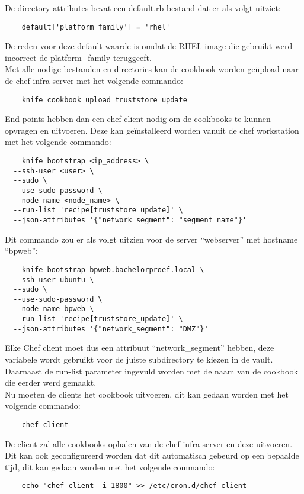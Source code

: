De directory attributes bevat een default.rb bestand dat er als volgt uitziet:
\begin{verbatim}
    default['platform_family'] = 'rhel'
\end{verbatim}

De reden voor deze default waarde is omdat de RHEL image die gebruikt werd incorrect de platform\_family teruggeeft. \\

Met alle nodige bestanden en directories kan de cookbook worden geüpload naar de chef infra server met het volgende commando:
\begin{verbatim}
    knife cookbook upload truststore_update
\end{verbatim}

End-points hebben dan een chef client nodig om de cookbooks te kunnen opvragen en uitvoeren. Deze kan geïnstalleerd worden vanuit de chef workstation met het volgende commando:
\begin{verbatim}
    knife bootstrap <ip_address> \
  --ssh-user <user> \
  --sudo \
  --use-sudo-password \
  --node-name <node_name> \
  --run-list 'recipe[truststore_update]' \
  --json-attributes '{"network_segment": "segment_name"}'
\end{verbatim}

Dit commando zou er als volgt uitzien voor de server ``webserver'' met hostname ``bpweb'':
\begin{verbatim}
    knife bootstrap bpweb.bachelorproef.local \
  --ssh-user ubuntu \
  --sudo \
  --use-sudo-password \
  --node-name bpweb \
  --run-list 'recipe[truststore_update]' \
  --json-attributes '{"network_segment": "DMZ"}'
\end{verbatim}

Elke Chef client moet dus een attribuut ``network\_segment'' hebben, deze variabele wordt gebruikt voor de juiste subdirectory te kiezen in de vault. Daarnaast de run-list parameter ingevuld worden met de naam van de cookbook die eerder werd gemaakt. \\

Nu moeten de clients het cookbook uitvoeren, dit kan gedaan worden met het volgende commando:
\begin{verbatim}
    chef-client
\end{verbatim} 

De client zal alle cookbooks ophalen van de chef infra server en deze uitvoeren. Dit kan ook geconfigureerd worden dat dit automatisch gebeurd op een bepaalde tijd, dit kan gedaan worden met het volgende commando:
\begin{verbatim}
    echo "chef-client -i 1800" >> /etc/cron.d/chef-client
\end{verbatim}

